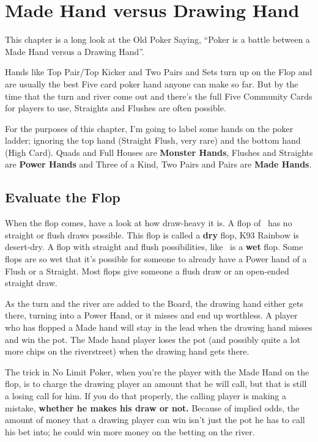 \chapter{Made Hand versus Drawing Hand}


This chapter is a long look at the Old Poker Saying, ``Poker
is a battle between a Made Hand versus a Drawing Hand''.

Hands like Top Pair/Top Kicker and Two Pairs and Sets turn up on the
Flop and are usually the best Five card poker hand anyone can
make so far. But by the time that the turn and river come out and
there's the full Five Community Cards for players to use, Straights
and Flushes are often possible.

For the purposes of this chapter, I'm going to label some hands on the
poker ladder; ignoring the top hand (Straight Flush, very rare) and
the bottom hand (High Card). Quads and Full Houses are \textbf{Monster
Hands}, Flushes and Straights are \textbf{Power Hands} and Three of a
Kind, Two Pairs and Pairs are \textbf{Made Hands}.


\section{Evaluate the Flop}

When the flop comes, have a look at how draw-heavy it is. A flop of
\Ks\nineh\trec\ has no straight or flush draws possible. This flop is
called a \textbf{dry} flop, K93 Rainbow is desert-dry. A flop with
straight and flush possibilities, like \tend\nined\sixh\ is a
\textbf{wet} flop. Some flops are so wet that it's possible for
someone to already have a Power hand of a Flush or a Straight. Most
flops give someone a flush draw or an open-ended straight draw.

As the turn and the river are added to the Board, the drawing hand
either gets there, turning into a Power Hand, or it misses and end up
worthless. A player who has flopped a Made hand will stay in the lead
when the drawing hand misses and win the pot. The Made hand player
loses the pot (and possibly quite a lot more chips on the riverstreet)
when the drawing hand gets there.

The trick in No Limit Poker, when you're the player with the Made Hand
on the flop, is to charge the drawing player an amount that he will
call, but that is still a losing call for him. If
you do that properly, the calling player is making a mistake,
\textbf{whether he makes his draw or not.} Because of implied odds,
the amount of money that a drawing player can win isn't just the pot
he has to call his bet into; he could win more money on the betting on
the river.

